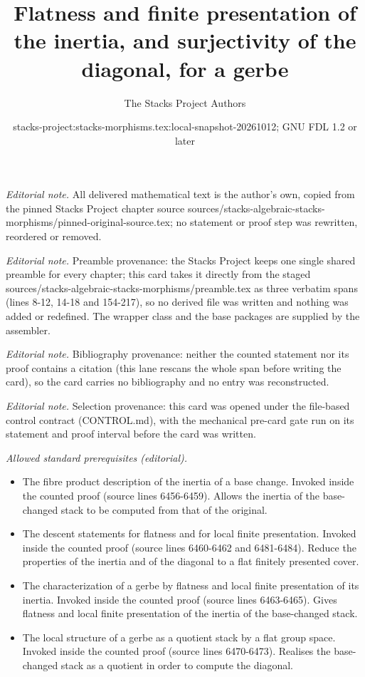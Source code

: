 \documentclass[10pt,a4paper]{amsart}
\title{Flatness and finite presentation of the inertia, and surjectivity of the diagonal, for a gerbe}
\author{The Stacks Project Authors}
\date{stacks-project:stacks-morphisms.tex:local-snapshot-20261012; GNU FDL 1.2 or later}
\theoremstyle{plain}
\theoremstyle{definition}
\theoremstyle{remark}
\numberwithin{equation}{subsection}
\begin{document}
\maketitle
\noindent\textit{Editorial note.} All delivered mathematical text is the author's own, copied from the pinned Stacks Project chapter source sources/stacks-algebraic-stacks-morphisms/pinned-original-source.tex; no statement or proof step was rewritten, reordered or removed.\par\medskip
\noindent\textit{Editorial note.} Preamble provenance: the Stacks Project keeps one single shared preamble for every chapter; this card takes it directly from the staged sources/stacks-algebraic-stacks-morphisms/preamble.tex as three verbatim spans (lines 8-12, 14-18 and 154-217), so no derived file was written and nothing was added or redefined. The wrapper class and the base packages are supplied by the assembler.\par\medskip
\noindent\textit{Editorial note.} Bibliography provenance: neither the counted statement nor its proof contains a citation (this lane rescans the whole span before writing the card), so the card carries no bibliography and no entry was reconstructed.\par\medskip
\noindent\textit{Editorial note.} Selection provenance: this card was opened under the file-based control contract (CONTROL.md), with the mechanical pre-card gate run on its statement and proof interval before the card was written.\par\medskip
\noindent\textit{Allowed standard prerequisites (editorial).}\begin{itemize}
\item The fibre product description of the inertia of a base change. Invoked inside the counted proof (source lines 6456-6459). Allows the inertia of the base-changed stack to be computed from that of the original.
\item The descent statements for flatness and for local finite presentation. Invoked inside the counted proof (source lines 6460-6462 and 6481-6484). Reduce the properties of the inertia and of the diagonal to a flat finitely presented cover.
\item The characterization of a gerbe by flatness and local finite presentation of its inertia. Invoked inside the counted proof (source lines 6463-6465). Gives flatness and local finite presentation of the inertia of the base-changed stack.
\item The local structure of a gerbe as a quotient stack by a flat group space. Invoked inside the counted proof (source lines 6470-6473). Realises the base-changed stack as a quotient in order to compute the diagonal.
\end{itemize}\medskip
\end{document}
